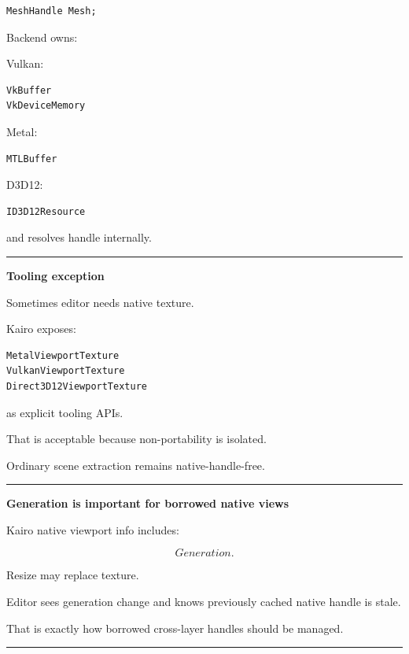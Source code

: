 \begin{verbatim}
MeshHandle Mesh;
\end{verbatim}

Backend owns:

Vulkan:

\begin{verbatim}
VkBuffer
VkDeviceMemory
\end{verbatim}

Metal:

\begin{verbatim}
MTLBuffer
\end{verbatim}

D3D12:

\begin{verbatim}
ID3D12Resource
\end{verbatim}

and resolves handle internally.

\begin{center}\rule{0.5\linewidth}{0.5pt}\end{center}

\textbf{Tooling exception}

Sometimes editor needs native texture.

Kairo exposes:

\begin{verbatim}
MetalViewportTexture
VulkanViewportTexture
Direct3D12ViewportTexture
\end{verbatim}

as explicit tooling APIs.

That is acceptable because non-portability is isolated.

Ordinary scene extraction remains native-handle-free.

\begin{center}\rule{0.5\linewidth}{0.5pt}\end{center}

\textbf{Generation is important for borrowed native views}

Kairo native viewport info includes:

\[
Generation.
\]

Resize may replace texture.

Editor sees generation change and knows previously cached native handle is stale.

That is exactly how borrowed cross-layer handles should be managed.

\begin{center}\rule{0.5\linewidth}{0.5pt}\end{center}

